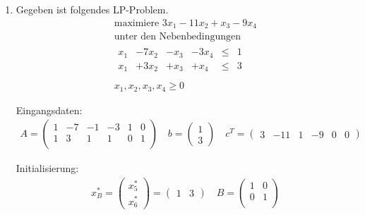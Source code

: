 \documentclass[a4paper]{scrartcl}
\begin{document}
\begin{enumerate}[label=\bfseries\arabic*.]
\begin{enumerate}
\begin{enumerate}[1.]
\begin{enumerate}[1.]
                        \end{enumerate}

                \end{enumerate}

        \end{enumerate}

    \item %
        Gegeben ist folgendes LP-Problem.
        \begin{equation}
            \begin{gathered}
                \text{maximiere }
                3x_1 -11x_2 +x_3 -9x_4 \\
                \text{unter den Nebenbedingungen} \\
                \begin{array}{rrrrcr}
                    x_1 & -7x_2 & -x_3 & -3x_4 & \leq & 1 \\
                    x_1 & +3x_2 & +x_3 & +x_4 & \leq & 3 \\
                \end{array} \\
                x_1, x_2, x_3, x_4 \geq 0
            \end{gathered}
        \end{equation}

        Eingangsdaten:
        \begin{gather}
            A =
            \begin{pmatrix}
                1 & -7 & -1 & -3 & 1 & 0 \\
                1 &  3 &  1 &  1 & 0 & 1 \\
            \end{pmatrix}
            \quad
            b =
            \begin{pmatrix}
                1 \\ 3
            \end{pmatrix}
            \quad
            c^T =
            \begin{pmatrix}
                3 & -11 & 1 & -9 & 0 & 0
            \end{pmatrix}
        \end{gather}

        Initialisierung:
        \begin{gather}
            x_B^* =
            \begin{pmatrix}
                x_5^* \\ x_6^*
            \end{pmatrix}
            =
            \begin{pmatrix}
                1 & 3
            \end{pmatrix}
            \quad
            B =
            \begin{pmatrix}
                1 & 0 \\
                0 & 1 \\
            \end{pmatrix}
        \end{gather}


\end{enumerate}
\end{document}
